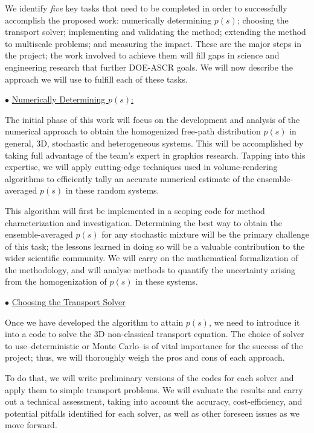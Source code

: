 \documentclass[12pt]{article}
\begin{document}
We identify \textit{five} key tasks that need to be completed in order to successfully accomplish the proposed work: numerically determining $p(s)$; choosing the transport solver; implementing and validating the method; extending the method to multiscale problems; and measuring the impact.
These are the major steps in the project; the work involved to achieve them will fill gaps in science and engineering research that further DOE-ASCR goals.
We will now describe the approach we will use to fulfill each of these tasks. 

$\bullet$ \underline{Numerically Determining $p(s)$:}

The initial phase of this work will focus on the development and analysis of the numerical approach to obtain the homogenized free-path distribution $p(s)$ in general, 3D, stochastic and heterogeneous systems.
This will be accomplished by taking full advantage of the team's expert in graphics research.
Tapping into this expertise, we will apply cutting-edge techniques used in volume-rendering algorithms to efficiently tally an accurate numerical estimate of the ensemble-averaged $p(s)$ in these random systems. 

This algorithm will first be implemented in a scoping code for method characterization and investigation.
Determining the best way to obtain the ensemble-averaged $p(s)$ for any stochastic mixture will be the primary challenge of this task; the lessons learned in doing so will be a valuable contribution to the wider scientific community.
We will carry on the mathematical formalization of the methodology, and will analyse methods to quantify the uncertainty arising from the homogenization of $p(s)$ in these systems.

$\bullet$ \underline{Choosing the Transport Solver}

Once we have developed the algorithm to attain $p(s)$, we need to introduce it into a code to solve the 3D non-classical transport equation.
The choice of solver to use--deterministic or Monte Carlo--is of vital importance for the success of the project; thus, we will thoroughly weigh the pros and cons of each approach.

To do that, we will write preliminary versions of the codes for each solver and apply them to simple transport problems.
We will evaluate the results and carry out a technical assessment, taking into account the accuracy, cost-efficiency, and potential pitfalls identified for each solver, as well as other foreseen issues as we move forward.
\end{document}
